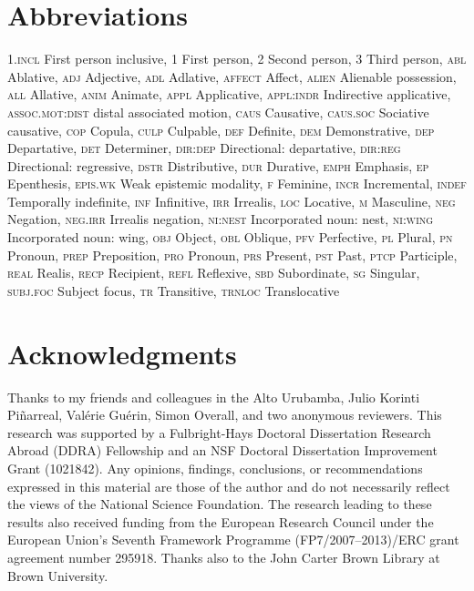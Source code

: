 \documentclass[output=paper]{LSP/langsci}
\begin{document}
\section*{ Abbreviations}
\textsc{1.incl}   First person inclusive,
1      First person,
2      Second person,
3      Third person,
\textsc{abl}      Ablative,
\textsc{adj}      Adjective,
\textsc{adl}      Adlative,
\textsc{affect}      Affect,
\textsc{alien}      Alienable possession,
\textsc{all}      Allative,
\textsc{anim}      Animate,
\textsc{appl}      Applicative,
\textsc{appl:indr}    Indirective applicative,
\textsc{assoc.mot:dist}  distal associated motion,
\textsc{caus}      Causative,
\textsc{caus.soc}    Sociative causative,
\textsc{cop}      Copula,
\textsc{culp}      Culpable,
\textsc{def}      Definite,
\textsc{dem}      Demonstrative,
\textsc{dep}      Departative,
\textsc{det}      Determiner,
\textsc{dir:dep}    Directional: departative,
\textsc{dir:reg}    Directional: regressive,
\textsc{dstr}      Distributive,
\textsc{dur}      Durative,
\textsc{emph}      Emphasis,
\textsc{ep}      Epenthesis,
\textsc{epis.wk}    Weak epistemic modality,
\textsc{f}      Feminine,
\textsc{incr}      Incremental,
\textsc{indef}      Temporally indefinite,
\textsc{inf}      Infinitive,
\textsc{irr}      Irrealis,
\textsc{loc}      Locative,
\textsc{m}      Masculine,
\textsc{neg}      Negation,
\textsc{neg.irr} Irrealis negation,
\textsc{ni:nest}   Incorporated noun: nest,
\textsc{ni:wing}    Incorporated noun: wing,
\textsc{obj}      Object,
\textsc{obl}      Oblique,
\textsc{pfv}      Perfective,
\textsc{pl}      Plural,
\textsc{pn}      Pronoun,
\textsc{prep}      Preposition,
\textsc{pro}      Pronoun,
\textsc{prs}      Present,
\textsc{pst}      Past,
\textsc{ptcp}      Participle,
\textsc{real}      Realis,
\textsc{recp}      Recipient,
\textsc{refl}      Reflexive,
\textsc{sbd}      Subordinate,
\textsc{sg}      Singular,
\textsc{subj.foc}    Subject focus,
\textsc{tr}      Transitive,
\textsc{trnloc}     Translocative

\section*{ Acknowledgments}
Thanks to my  friends and colleagues in the {Alto Urubamba}, Julio Korinti Piñarreal, Valérie Guérin, Simon Overall, and two anonymous reviewers. This research was supported by a Fulbright-Hays Doctoral Dissertation Research Abroad (DDRA) Fellowship and an NSF Doctoral Dissertation Improvement Grant (1021842). Any opinions, findings, conclusions, or recommendations expressed in this material are those of the author and do not necessarily reflect the views of the National Science Foundation. The research leading to these results also received funding from the European Research Council under the European Union’s Seventh Framework Programme (FP7/2007–2013)/ERC grant agreement number 295918. Thanks also to the John Carter Brown Library at Brown University.
%

\sloppy

\printbibliography[heading=subbibliography,notkeyword=this] 
\end{document}
